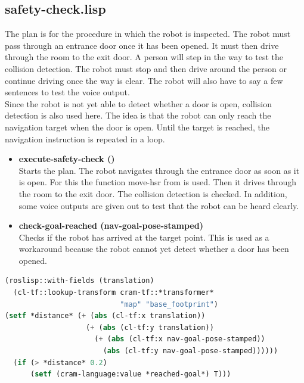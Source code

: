 \documentclass[main.tex]{subfiles}
\begin{document}
        \subsection{safety-check.lisp}
        The plan is for the procedure in which the robot is inspected. The robot must pass through an entrance door once it has been opened. It must then drive through the room to the exit door. A person will step in the way to test the collision detection.  The robot must stop and then drive around the person or continue driving once the way is clear. The robot will also have to say a few sentences to test the voice output. \\
            Since the robot is not yet able to detect whether a door is open, collision detection is also used here. The idea is that the robot can only reach the navigation target when the door is open. Until the target is reached, the navigation instruction is repeated in a loop.
        \begin{itemize}
            \item \textbf{execute-safety-check ()} \\
            Starts the plan. The robot navigates through the entrance door as soon as it is open. For this the function move-hsr from  is used. Then it drives through the room to the exit door. The collision detection is checked. In addition, some voice outputs are given out to test that the robot can be heard clearly.
            \item \textbf{check-goal-reached (nav-goal-pose-stamped)}\\
            Checks if the robot has arrived at the target point. This is used as a workaround because the robot cannot yet detect whether a door has been opened.
        \end{itemize}
            \begin{lstlisting}[language=lisp]
(roslisp::with-fields (translation) 
  (cl-tf::lookup-transform cram-tf::*transformer* 
                           "map" "base_footprint")
(setf *distance* (+ (abs (cl-tf:x translation))
                   (+ (abs (cl-tf:y translation))
                     (+ (abs (cl-tf:x nav-goal-pose-stamped))
                       (abs (cl-tf:y nav-goal-pose-stamped))))))
  (if (> *distance* 0.2) 
      (setf (cram-language:value *reached-goal*) T)))
          \end{lstlisting}
\end{document}
